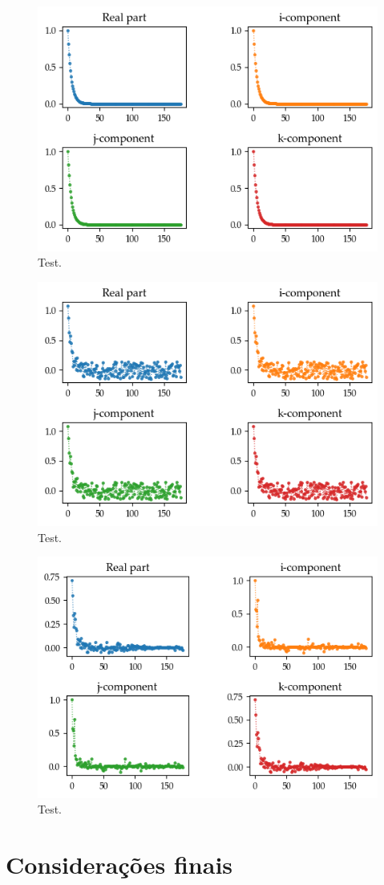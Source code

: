 \begin{figure}
	\centering
	\includegraphics[width=0.55\linewidth]{thesis/Figures/uk_graph_kernel.png}
	\caption{Test.}
	\label{fig:uk_graph_kernel}
\end{figure}

\begin{figure}
	\centering
	\includegraphics[width=0.55\linewidth]{thesis/Figures/uk_graph_kernel_noisy.png}
	\caption{Test.}
	\label{fig:uk_graph_kernel_noisy}
\end{figure}

\begin{figure}
	\centering
	\includegraphics[width=0.55\linewidth]{thesis/Figures/uk_graph_filtered.png}
	\caption{Test.}
	\label{fig:uk_graph_filtered}
\end{figure}

\chapter[Considera\c c\~oes finais]{Considera\c c\~oes finais}
\label{ch:others}

